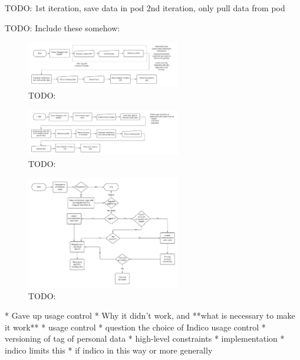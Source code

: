 TODO:
1st iteration, save data in pod
2nd iteration, only pull data from pod

TODO: Include these somehow:

\begin{figure}
    \centering
    \includegraphics[width=0.6\textwidth]{prototype/graphs/poc-conference_registration_flow-client_side-sideways.jpeg}
    \caption{TODO:}
    \label{fig:poc-conference_registration_flow-client_side-sideways}
\end{figure}

\begin{figure}
    \centering
    \includegraphics[width=0.6\textwidth]{prototype/graphs/poc-conference_registration_flow-server_side-sideways.jpeg}
    \caption{TODO:}
    \label{fig:poc-conference_registration_flow-server_side-sideways}
\end{figure}

\begin{figure}
    \centering
    \includegraphics[width=0.6\textwidth]{prototype/graphs/poc-conference_registration_flow-sideways.jpeg}
    \caption{TODO:}
    \label{fig:poc-conference_registration_flow-sideways}
\end{figure}

* Gave up usage control
  * Why it didn't work, and **what is necessary to make it work**
    * usage control
    * question the choice of Indico usage control
    * versioning of tag of personal data
* high-level constraints
* implementation
  * indico limits this
* if indico in this way or more generally

